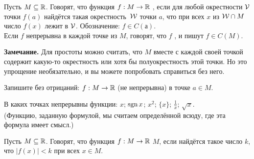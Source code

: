\documentclass[a4paper,12pt]{article}
\begin{document}




Пусть $M \subseteq\mathbb{R}$. Говорят, что функция $f:M\rightarrow\mathbb{R}$
,
если для любой окрестности ${\cal V}$ точки $f(a)$
найдётся такая окрестность~${\cal W}$ точки $a$, что при всех $x$ из ${\cal W}\cap M$
число $f(x)$ лежит в $\cal V$. Обозначение: $f\in C(а)$.\\
Если $f$ непрерывна в каждой точке из $M$, говорят, что $f$ , и пишут
\hbox{$f\in C(M)$.}

\noindent
{\bf Замечание.}
Для простоты можно считать, что $M$ вместе с каждой своей точкой содержит какую-то окрестность или хотя бы полуокрестность этой точки. Но это упрощение  необязательно, и вы можете попробовать справиться без него.

 Запишите без отрицаний: $f:M \rightarrow \mathbb{R}$
 (не непрерывна) в точке $a\in M$.

 В каких точках непрерывны %
функции:
   $x$;
   $\mathop{\mbox{\rm sgn}}x$;
   $x^2$;
   $\{x\}$;
   $\frac 1x$;
   $\sqrt x$.\\
{\small (Функцию, заданную формулой, мы считаем определённой
всюду, где эта формула имеет смысл.)}


Пусть $M\subseteq\mathbb{R}$.
Говорят, что функция $f:M\rightarrow\mathbb{R}$ 
$M$, если найдётся такое число $k$, что $|f(x)|<k$ при всех $x\in M$.
\end{document}
